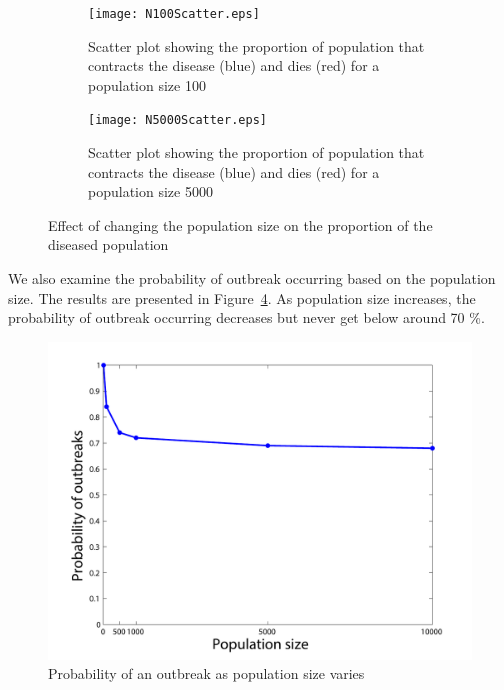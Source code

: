 \begin{figure} [h!]
\centering 
\begin{subfigure}[b]{0.3\textwidth} \texttt{[image: N100Scatter.eps]} \caption{Scatter plot showing the proportion of population that contracts the disease (blue) and dies (red) for a population size 100} \label{fig:N100} \end{subfigure} 
\hspace{2cm}
 \begin{subfigure}[b]{0.3\textwidth} \texttt{[image: N5000Scatter.eps]} \caption{Scatter plot showing the proportion of population that contracts the disease (blue) and dies (red) for a population size 5000} \label{fig:N5000} \end{subfigure} 
 \caption{Effect of changing the population size on the proportion of the diseased population} %
 \label{fig:VarPopSize}
  \end{figure}
We also examine the probability of outbreak occurring based on the population size. The results are presented in Figure~\ref{fig:OtbreakProb}. As population size increases, the probability of outbreak occurring decreases but never get below around 70 \%. 
\begin{figure}[h!]
\begin{center}
\includegraphics[scale=0.5]{OutbreakProb}
\end{center}
\caption{Probability of an outbreak as population size varies}
\label{fig:OtbreakProb}
\end{figure}









